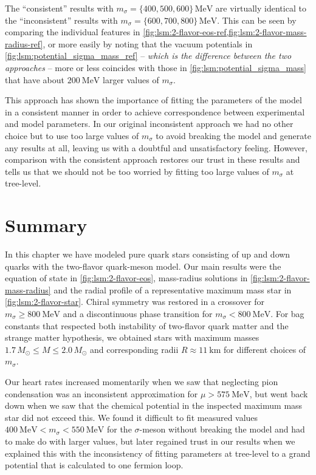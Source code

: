 The ``consistent'' results with $m_\sigma=\{400,500,600\} \, \si{\mega\electronvolt}$ are
virtually identical to the ``inconsistent'' results with $m_\sigma=\{600,700,800\} \, \si{\mega\electronvolt}$.
This can be seen by comparing the individual features in \cref{fig:lsm:2-flavor-eos-ref,fig:lsm:2-flavor-mass-radius-ref},
or more easily by noting that the vacuum potentials in \cref{fig:lsm:potential_sigma_mass_ref}
-- \emph{which is the difference between the two approaches} --
more or less coincides with those in \cref{fig:lsm:potential_sigma_mass} that have about $\SI{200}{\mega\electronvolt}$ larger values of $m_\sigma$.

This approach has shown the importance of fitting the parameters of the model in a consistent manner in order to achieve correspondence between experimental and model parameters.
In our original inconsistent approach we had no other choice but to use too large values of $m_\sigma$ to avoid breaking the model and generate any results at all,
leaving us with a doubtful and unsatisfactory feeling.
However, comparison with the consistent approach restores our trust in these results
and tells us that we should not be too worried by fitting too large values of $m_\sigma$ at tree-level.

\section{Summary}

In this chapter we have modeled pure quark stars consisting of up and down quarks with the two-flavor quark-meson model.
Our main results were the equation of state in \cref{fig:lsm:2-flavor-eos}, mass-radius solutions in \cref{fig:lsm:2-flavor-mass-radius} and the radial profile of a representative maximum mass star in \cref{fig:lsm:2-flavor-star}.
Chiral symmetry was restored in a crossover for $m_\sigma \geq \SI{800}{\mega\electronvolt}$ and a discontinuous phase transition for $m_\sigma < \SI{800}{\mega\electronvolt}$.
For bag constants that respected both instability of two-flavor quark matter and the strange matter hypothesis,
we obtained stars with maximum masses $1.7 \, M_\odot \leq M \leq 2.0 \, M_\odot$ and corresponding radii $R \approx \SI{11}{\kilo\meter}$ for different choices of $m_\sigma$.

Our heart rates increased momentarily when we saw that neglecting pion condensation was an inconsistent approximation for $\mu > \SI{575}{\mega\electronvolt}$,
but went back down when we saw that the chemical potential in the inspected maximum mass star did not exceed this.
We found it difficult to fit measured values $\SI{400}{\mega\electronvolt} < m_\sigma < \SI{550}{\mega\electronvolt}$ for the $\sigma$-meson without breaking the model and had to make do with larger values,
but later regained trust in our results when we explained this with the inconsistency of fitting parameters at tree-level to a grand potential that is calculated to one fermion loop.

